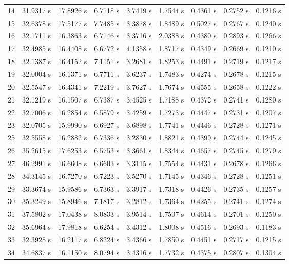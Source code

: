 \begin{landscape}
\begin{longtable}{cllllllll}
    14 &31.9317 s& 17.8926 s& 6.7118 s& 3.7419 s& 1.7544 s& 0.4361 s& 0.2752 s& 0.1216 s\\
    15 &32.6378 s& 17.5177 s& 7.7485 s & 3.3878 s& 1.8489 s& 0.5027 s& 0.2767 s& 0.1240 s\\
    16 &32.1711 s& 16.3863 s& 6.7146 s& 3.3716 s& 2.0388 s& 0.4380 s& 0.2893 s& 0.1266 s\\
    17 &32.4985 s& 16.4408 s& 6.6772 s& 4.1358 s& 1.8717 s& 0.4349 s& 0.2669 s& 0.1210 s\\
    18 &32.1387 s& 16.4152 s& 7.1151 s& 3.2681 s  & 1.8253 s& 0.4491 s& 0.2719 s& 0.1217 s\\
    19 &32.0004 s& 16.1371 s& 6.7711 s& 3.6237 s& 1.7483 s& 0.4274 s& 0.2678 s& 0.1215 s\\
    20 &32.5547 s& 16.4341 s& 7.2219 s& 3.7627 s& 1.7674 s& 0.4555 s& 0.2658 s& 0.1222 s \\
    21 &32.1219 s& 16.1507 s& 6.7387 s& 3.4525 s& 1.7188 s& 0.4372 s& 0.2741 s& 0.1280 s \\
    22 &32.7006 s& 16.2854 s& 6.5879 s & 3.4259 s& 1.7273 s& 0.4447 s& 0.2731 s& 0.1207 s\\
    23 &32.0705 s& 15.9990 s& 6.6927 s& 3.6898 s& 1.7741 s& 0.4446 s & 0.2728 s& 0.1271 s\\
    25 &32.5558 s& 16.2882 s& 6.7336 s& 3.2830 s& 1.8821 s& 0.4399 s& 0.2744 s& 0.1245 s\\
    26 &35.2615 s& 17.6253 s& 6.5753 s& 3.3661 s& 1.8344 s& 0.4657 s& 0.2745 s& 0.1279 s\\
    27 &46.2991 s & 16.6608 s& 6.6603 s& 3.3115 s& 1.7554 s& 0.4431 s& 0.2678 s& 0.1266 s\\
    28 &34.3145 s& 16.7270 s& 6.7223 s& 3.5270 s& 1.7145 s& 0.4346 s& 0.2728 s & 0.1251 s\\
    29 &33.3674 s& 15.9586 s& 6.7363 s & 3.3917 s& 1.7318 s& 0.4426 s& 0.2735 s & 0.1257 s\\
    30 &35.3249 s& 15.8946 s& 7.1817 s& 3.2812 s& 1.7364 s& 0.4255 s& 0.2741 s& 0.1274 s \\
    31 &37.5802 s& 17.0438 s& 8.0833 s& 3.9514 s& 1.7507 s& 0.4614 s& 0.2701 s& 0.1250 s\\
    32 &35.6964 s& 17.9818 s& 6.6254 s& 3.4312 s& 1.8008 s& 0.4516 s& 0.2693 s& 0.1183 s\\
    33 &32.3928 s& 16.2117 s& 6.8224 s& 3.4366 s& 1.7850 s& 0.4451 s& 0.2717 s& 0.1215 s\\
    34 &34.6837 s& 16.1150 s& 8.0794 s& 3.4316 s& 1.7732 s& 0.4375 s& 0.2807 s& 0.1304 s\\

\end{longtable}
\end{landscape}
